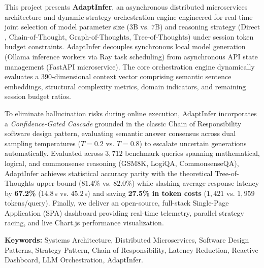 \documentclass[12pt,a4paper]{report}
\begin{document}
This project presents \textbf{AdaptInfer}, an asynchronous distributed microservices architecture and dynamic strategy orchestration engine engineered for real-time joint selection of model parameter size ($3\text{B}$ vs. $7\text{B}$) and reasoning strategy ($\text{Direct}$, $\text{Chain-of-Thought}$, $\text{Graph-of-Thoughts}$, $\text{Tree-of-Thoughts}$) under session token budget constraints. AdaptInfer decouples synchronous local model generation (Ollama inference workers via Ray task scheduling) from asynchronous API state management (FastAPI microservice). The core orchestration engine dynamically evaluates a $390$-dimensional context vector comprising semantic sentence embeddings, structural complexity metrics, domain indicators, and remaining session budget ratios.

To eliminate hallucination risks during online execution, AdaptInfer incorporates a \textit{Confidence-Gated Cascade} grounded in the classic Chain of Responsibility software design pattern, evaluating semantic answer consensus across dual sampling temperatures ($T=0.2$ vs. $T=0.8$) to escalate uncertain generations automatically. Evaluated across $3,712$ benchmark queries spanning mathematical, logical, and commonsense reasoning (GSM8K, LogiQA, CommonsenseQA), AdaptInfer achieves statistical accuracy parity with the theoretical Tree-of-Thoughts upper bound ($81.4\%$ vs. $82.0\%$) while slashing average response latency by \textbf{67.2\%} ($14.8$\,s vs. $45.2$\,s) and saving \textbf{27.5\% in token costs} ($1,421$ vs. $1,959$ tokens/query). Finally, we deliver an open-source, full-stack Single-Page Application (SPA) dashboard providing real-time telemetry, parallel strategy racing, and live Chart.js performance visualization.

\vspace{0.8cm}
\noindent
\textbf{Keywords:} Systems Architecture, Distributed Microservices, Software Design Patterns, Strategy Pattern, Chain of Responsibility, Latency Reduction, Reactive Dashboard, LLM Orchestration, AdaptInfer.

\tableofcontents
\listoffigures
\listoftables

\newpage
\end{document}
